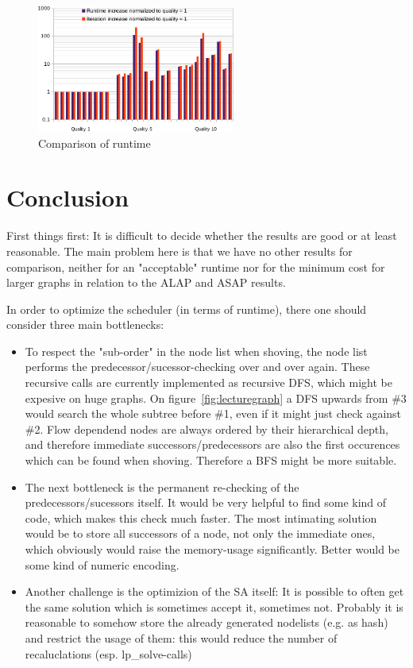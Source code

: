 \documentclass[colorback,accentcolor=tud1c,11pt]{tudreport}
\begin{document}
  \begin{figure}
	\centering
	\includegraphics[width=0.58\textwidth]{runtime_compare.pdf}
	\caption{Comparison of runtime}
	\label{fig:runtimecompare}
  \end{figure}
  
 


 
 \chapter{Conclusion}
 First things first: It is difficult to decide whether the results are good or at least reasonable. The main problem here is that we have no other results for comparison, neither for an "acceptable" runtime nor for the minimum cost for larger graphs in relation to the ALAP and ASAP results.
 
 In order to optimize the scheduler (in terms of runtime), there one should consider three main bottlenecks:
 \begin{itemize}
 	\item{To respect the "sub-order" in the node list when shoving, the node list performs the predecessor/sucessor-checking over and over again. These recursive calls are currently implemented as recursive DFS, which might be expesive on huge graphs. On figure~\ref{fig:lecturegraph} a DFS upwards from \#3 would search the whole subtree before \#1, even if it might just check against \#2. Flow dependend nodes are always ordered by their hierarchical depth, and therefore immediate successors/predecessors are also the first occurences which can be found when shoving. Therefore a BFS might be more suitable.}
 	\item{The next bottleneck is the permanent re-checking of the predecessors/sucessors itself. It would be very helpful to find some kind of code, which makes this check much faster. The most intimating solution would be to store all successors of a node, not only the immediate ones, which obviously would raise the memory-usage significantly. Better would be some kind of numeric encoding.}
 	\item{Another challenge is the optimizion of the SA itself: It is possible to often get the same solution which is sometimes accept it, sometimes not. Probably it is reasonable to somehow store the already generated nodelists (e.g. as hash) and restrict the usage of them: this would reduce the number of recaluclations (esp. lp\_solve-calls)}
 \end{itemize}
 

  
  
\end{document}
